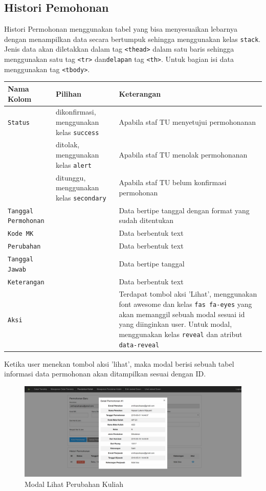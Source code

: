 \documentclass[a4paper,twoside]{article}
\begin{document}
\begin{enumerate}
		\subsection{Histori Pemohonan}
		Histori Permohonan menggunakan tabel yang bisa menyesuaikan lebarnya dengan menampilkan data secara bertumpuk sehingga menggunakan kelas \texttt{stack}. Jenis data akan diletakkan dalam tag \texttt{<thead>} dalam satu baris sehingga menggunakan satu tag \texttt{<tr>} dan\texttt{delapan} tag \texttt{<th>}. Untuk bagian isi data menggunakan tag \texttt{<tbody>}.
		\begin{tabular}{ |p{4cm}|p{2cm}|p{10cm}|  }
			\hline
			Nama Kolom & Pilihan & Keterangan\\
			\hline
			\texttt{Status} & dikonfirmasi, menggunakan kelas \verb|success| & Apabila staf TU menyetujui permohonanan\\
			\hline
			&  ditolak, menggunakan kelas \verb|alert|  & Apabila staf TU menolak permohonanan\\
			\hline
			& ditunggu, menggunakan kelas \verb|secondary| &  Apabila staf TU belum konfirmasi permohonan \\
			\hline
			\texttt{Tanggal Permohonan}    & & Data bertipe tanggal dengan format yang sudah ditentukan\\
			\hline
			\texttt{Kode MK} &  & Data berbentuk text \\
			\hline
			\texttt{Perubahan} &  & Data berbentuk text \\
			\hline
			\texttt{Tanggal Jawab} &  & Data bertipe tanggal \\
			\hline
			\texttt{Keterangan} &  & Data berbentuk text \\
			\hline
			\texttt{Aksi} &  & Terdapat tombol aksi 'Lihat', menggunakan font awesome dan kelas \verb|fas fa-eyes| yang akan memanggil sebuah modal sesuai id yang diinginkan user. Untuk modal, menggunakan kelas \texttt{reveal} dan atribut \texttt{data-reveal}\\
			\hline
		\end{tabular}
		Ketika user menekan tombol aksi 'lihat', maka modal berisi sebuah tabel informasi data permohonan akan ditampilkan sesuai dengan ID.
		\begin{figure} [H]
			\centering  
			\includegraphics[scale=0.5]{Modal-Lihat-Perubahan-Kuliah.png}  
			\caption{Modal Lihat Perubahan Kuliah} 
		\end{figure}
		

\end{enumerate}
\end{document}

